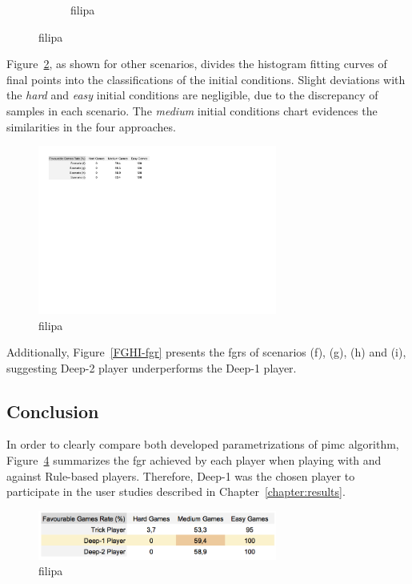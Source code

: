 \begin{figure}[h]
\begin{subfigure}[h]{0.32\textwidth}
                \caption{filipa}
                \label{fig:FGHIeasy}
        \end{subfigure}
        \caption{filipa}
        \label{fig:FGHI-CH}
\end{figure}

Figure~\ref{fig:FGHI-CH}, as shown for other scenarios, divides the histogram fitting curves of final points into the classifications of the initial conditions.
Slight deviations with the \emph{hard} and \emph{easy} initial conditions are negligible, due to the discrepancy of samples in each scenario.
The \emph{medium} initial conditions chart evidences the similarities in the four approaches.

\begin{figure}[h!]
  \centering
    \includegraphics[width=0.7\textwidth]{./img/4/FGHI-fgr}
  \caption{filipa}
\label{fig:FGHI-fgr}
\end{figure}

Additionally, Figure~\ref{FGHI-fgr} presents the \acp{fgr} of scenarios (f), (g), (h) and (i), suggesting Deep-2 player underperforms the Deep-1 player.

\subsection{Conclusion}

In order to clearly compare both developed parametrizations of \ac{pimc} algorithm, Figure~\ref{fig:DFH-fgr} summarizes the \ac{fgr} achieved by each player when playing with and against Rule-based players.
Therefore, Deep-1 was the chosen player to participate in the user studies described in Chapter~\ref{chapter:results}.

\begin{figure}[h!]
  \centering
    \includegraphics[width=0.7\textwidth]{./img/4/DFH-fgr}
  \caption{filipa}
\label{fig:DFH-fgr}
\end{figure}
